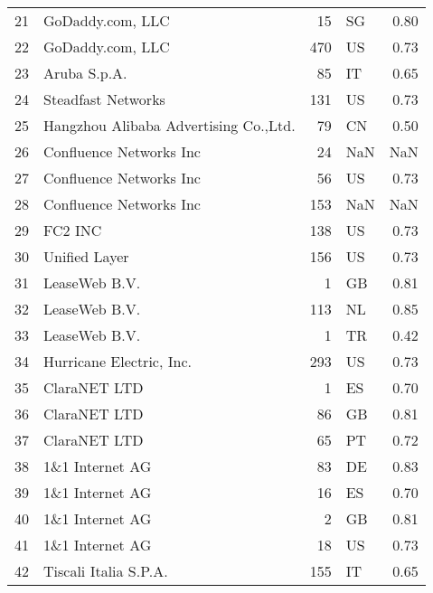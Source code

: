 \begin{tabular}{llrlr}
21 &                       GoDaddy.com, LLC &           15 &          SG &  0.80 \\
22 &                       GoDaddy.com, LLC &          470 &          US &  0.73 \\
23 &                           Aruba S.p.A. &           85 &          IT &  0.65 \\
24 &                     Steadfast Networks &          131 &          US &  0.73 \\
25 &  Hangzhou Alibaba Advertising Co.,Ltd. &           79 &          CN &  0.50 \\
26 &                Confluence Networks Inc &           24 &         NaN &   NaN \\
27 &                Confluence Networks Inc &           56 &          US &  0.73 \\
28 &                Confluence Networks Inc &          153 &         NaN &   NaN \\
29 &                                FC2 INC &          138 &          US &  0.73 \\
30 &                          Unified Layer &          156 &          US &  0.73 \\
31 &                          LeaseWeb B.V. &            1 &          GB &  0.81 \\
32 &                          LeaseWeb B.V. &          113 &          NL &  0.85 \\
33 &                          LeaseWeb B.V. &            1 &          TR &  0.42 \\
34 &               Hurricane Electric, Inc. &          293 &          US &  0.73 \\
35 &                           ClaraNET LTD &            1 &          ES &  0.70 \\
36 &                           ClaraNET LTD &           86 &          GB &  0.81 \\
37 &                           ClaraNET LTD &           65 &          PT &  0.72 \\
38 &                        1\&1 Internet AG &           83 &          DE &  0.83 \\
39 &                        1\&1 Internet AG &           16 &          ES &  0.70 \\
40 &                        1\&1 Internet AG &            2 &          GB &  0.81 \\
41 &                        1\&1 Internet AG &           18 &          US &  0.73 \\
42 &                  Tiscali Italia S.P.A. &          155 &          IT &  0.65 \\
\bottomrule
\end{tabular}
